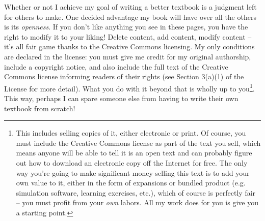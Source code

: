 Whether or not I achieve my goal of writing a better textbook is a judgment left for others to make.  One decided advantage my book will have over all the others is its \textit{openness}.  If you don't like anything you see in these pages, you have the right to modify it to your liking!  Delete content, add content, modify content -- it's all fair game thanks to the Creative Commons licensing.  My only conditions are declared in the license: you must give me credit for my original authorship, include a copyright notice, and also include the full text of the Creative Commons license informing readers of their rights (see Section 3(a)(1) of the License for more detail).  What you do with it beyond that is wholly up to you\footnote{This includes selling copies of it, either electronic or print.  Of course, you must include the Creative Commons license as part of the text you sell, which means anyone will be able to tell it is an open text and can probably figure out how to download an electronic copy off the Internet for free.  The only way you're going to make significant money selling this text is to add your own value to it, either in the form of expansions or bundled product (e.g. simulation software, learning exercises, etc.), which of course is perfectly fair -- you must profit from your \textit{own} labors.  All my work does for you is give you a starting point.}.  This way, perhaps I can spare someone else from having to write their own textbook from scratch!




